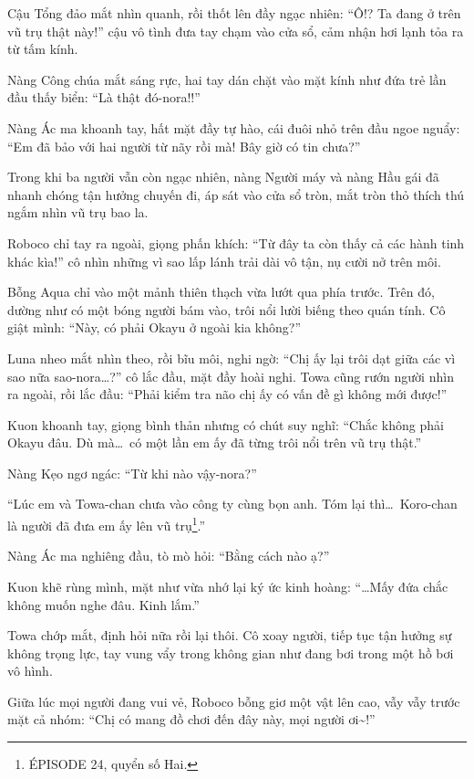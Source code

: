 \documentclass[../main.tex]{subfiles}
\begin{document}

Cậu Tổng đảo mắt nhìn quanh, rồi thốt lên đầy ngạc nhiên: ``Ô!? Ta đang ở trên vũ trụ thật này!'' cậu vô tình đưa tay chạm vào cửa sổ, cảm nhận hơi lạnh tỏa ra từ tấm kính.

Nàng Công chúa mắt sáng rực, hai tay dán chặt vào mặt kính như đứa trẻ lần đầu thấy biển: ``Là thật đó-nora!!''

Nàng Ác ma khoanh tay, hất mặt đầy tự hào, cái đuôi nhỏ trên đầu ngoe nguẩy: ``Em đã bảo với hai người từ nãy rồi mà! Bây giờ có tin chưa?''

Trong khi ba người vẫn còn ngạc nhiên, nàng Người máy và nàng Hầu gái đã nhanh chóng tận hưởng chuyến đi, áp sát vào cửa sổ tròn, mắt tròn thỏ thích thú ngắm nhìn vũ trụ bao la.

Roboco chỉ tay ra ngoài, giọng phấn khích: ``Từ đây ta còn thấy cả các hành tinh khác kìa!'' cô nhìn những vì sao lấp lánh trải dài vô tận, nụ cười nở trên môi.

Bỗng Aqua chỉ vào một mảnh thiên thạch vừa lướt qua phía trước. Trên đó, dường như có một bóng người bám vào, trôi nổi lười biếng theo quán tính. Cô giật mình: ``Này, có phải Okayu ở ngoài kia không?''


Luna nheo mắt nhìn theo, rồi bĩu môi, nghi ngờ: ``Chị ấy lại trôi dạt giữa các vì sao nữa sao-nora\dots?'' cô lắc đầu, mặt đầy hoài nghi. Towa cũng rướn người nhìn ra ngoài, rồi lắc đầu: ``Phải kiểm tra não chị ấy có vấn đề gì không mới được!''

Kuon khoanh tay, giọng bình thản nhưng có chút suy nghĩ: ``Chắc không phải Okayu đâu. Dù mà\dots\ có một lần em ấy đã từng trôi nổi trên vũ trụ thật.''

Nàng Kẹo ngơ ngác: ``Từ khi nào vậy-nora?''

``Lúc em và Towa-chan chưa vào công ty cùng bọn anh. Tóm lại thì\dots\ Koro-chan là người đã đưa em ấy lên vũ trụ\footnote{{\flaregothic ÉPISODE 24}, quyển số Hai.}.''

Nàng Ác ma nghiêng đầu, tò mò hỏi: ``Bằng cách nào ạ?''

Kuon khẽ rùng mình, mặt như vừa nhớ lại ký ức kinh hoàng: ``\dots Mấy đứa chắc không muốn nghe đâu. Kinh lắm.''

Towa chớp mắt, định hỏi nữa rồi lại thôi. Cô xoay người, tiếp tục tận hưởng sự không trọng lực, tay vung vẩy trong không gian như đang bơi trong một hồ bơi vô hình.

Giữa lúc mọi người đang vui vẻ, Roboco bỗng giơ một vật lên cao, vẫy vẫy trước mặt cả nhóm: ``Chị có mang đồ chơi đến đây này, mọi người ơi\~{}!''
\end{document}
